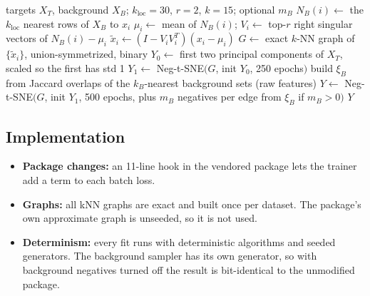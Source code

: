 \documentclass[10pt]{article}
\newcommand{\methodname}{BC-NE}
\newcommand{\T}{^{T}}
\newcommand{\xiB}{\xi_{B}}
\newcommand{\kloc}{k_{\mathrm{loc}}}
\begin{document}
\begin{algorithm}[htbp]
\caption{\methodname{} (with optional background negatives)}
\label{alg:method}
\begin{algorithmic}[1]
\Require targets $X_T$, background $X_B$; $\kloc=30$, $r=2$, $k=15$; optional $m_B$
  \State $N_B(i) \gets$ the $\kloc$ nearest rows of $X_B$ to $x_i$
  \State $\mu_i \gets$ mean of $N_B(i)$;\; $V_i \gets$ top-$r$ right singular vectors of $N_B(i) - \mu_i$
  \State $\tilde x_i \gets (I - V_iV_i\T)(x_i - \mu_i)$
\EndFor
\State $G \gets$ exact $k$-NN graph of $\{\tilde x_i\}$, union-symmetrized, binary
\State $Y_0 \gets$ first two principal components of $X_T$, scaled so the first has std 1
\State $Y_1 \gets$ Neg-t-SNE$(G$, init $Y_0$, 250 epochs$)$
  \State build $\xiB$ from Jaccard overlaps of the $k_B$-nearest background sets (raw features)
\EndIf
\State $Y \gets$ Neg-t-SNE$(G$, init $Y_1$, 500 epochs, plus $m_B$ negatives per edge from $\xiB$ if $m_B>0)$
\State \Return $Y$
\end{algorithmic}
\end{algorithm}

\subsection{Implementation}

\begin{itemize}
  \item \textbf{Package changes:} an 11-line hook in the vendored package lets the trainer add a term to each batch loss.
  \item \textbf{Graphs:} all kNN graphs are exact and built once per dataset. The package's own approximate graph is unseeded, so it is not used.
  \item \textbf{Determinism:} every fit runs with deterministic algorithms and seeded generators. The background sampler has its own generator, so with background negatives turned off the result is bit-identical to the unmodified package.
\end{itemize}
\end{document}
